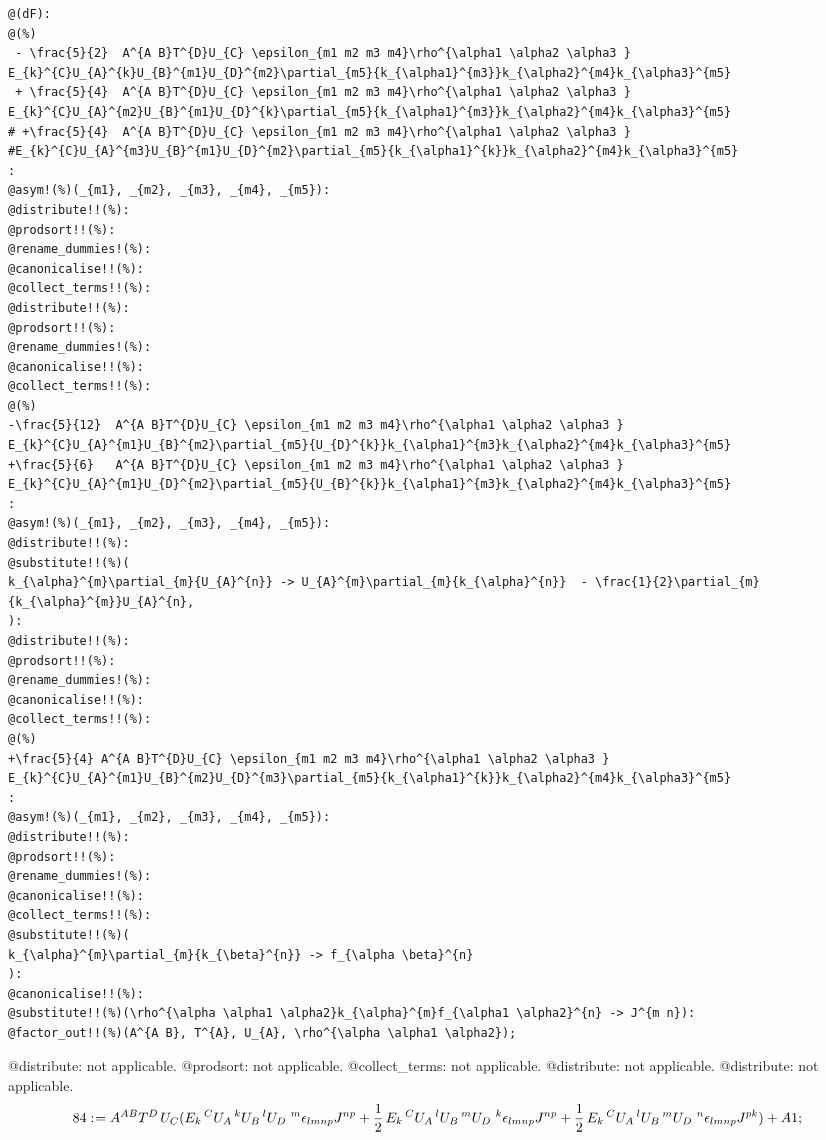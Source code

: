 \documentclass[11pt]{article}
\def\specialcolon{\mathrel{\mathop{:}}\hspace{-.5em}}
\begin{document}
{\color[named]{Blue}\begin{verbatim}
@(dF):
@(%) 
 - \frac{5}{2}  A^{A B}T^{D}U_{C} \epsilon_{m1 m2 m3 m4}\rho^{\alpha1 \alpha2 \alpha3 }
E_{k}^{C}U_{A}^{k}U_{B}^{m1}U_{D}^{m2}\partial_{m5}{k_{\alpha1}^{m3}}k_{\alpha2}^{m4}k_{\alpha3}^{m5}
 + \frac{5}{4}  A^{A B}T^{D}U_{C} \epsilon_{m1 m2 m3 m4}\rho^{\alpha1 \alpha2 \alpha3 }
E_{k}^{C}U_{A}^{m2}U_{B}^{m1}U_{D}^{k}\partial_{m5}{k_{\alpha1}^{m3}}k_{\alpha2}^{m4}k_{\alpha3}^{m5}
# +\frac{5}{4}  A^{A B}T^{D}U_{C} \epsilon_{m1 m2 m3 m4}\rho^{\alpha1 \alpha2 \alpha3 }
#E_{k}^{C}U_{A}^{m3}U_{B}^{m1}U_{D}^{m2}\partial_{m5}{k_{\alpha1}^{k}}k_{\alpha2}^{m4}k_{\alpha3}^{m5}
:
@asym!(%)(_{m1}, _{m2}, _{m3}, _{m4}, _{m5}):
@distribute!!(%):
@prodsort!!(%):
@rename_dummies!(%):
@canonicalise!!(%):
@collect_terms!!(%):
@distribute!!(%):
@prodsort!!(%):
@rename_dummies!(%):
@canonicalise!!(%):
@collect_terms!!(%):
@(%) 
-\frac{5}{12}  A^{A B}T^{D}U_{C} \epsilon_{m1 m2 m3 m4}\rho^{\alpha1 \alpha2 \alpha3 }
E_{k}^{C}U_{A}^{m1}U_{B}^{m2}\partial_{m5}{U_{D}^{k}}k_{\alpha1}^{m3}k_{\alpha2}^{m4}k_{\alpha3}^{m5}
+\frac{5}{6}   A^{A B}T^{D}U_{C} \epsilon_{m1 m2 m3 m4}\rho^{\alpha1 \alpha2 \alpha3 }
E_{k}^{C}U_{A}^{m1}U_{D}^{m2}\partial_{m5}{U_{B}^{k}}k_{\alpha1}^{m3}k_{\alpha2}^{m4}k_{\alpha3}^{m5}
:
@asym!(%)(_{m1}, _{m2}, _{m3}, _{m4}, _{m5}):
@distribute!!(%):
@substitute!!(%)(
k_{\alpha}^{m}\partial_{m}{U_{A}^{n}} -> U_{A}^{m}\partial_{m}{k_{\alpha}^{n}}  - \frac{1}{2}\partial_{m}{k_{\alpha}^{m}}U_{A}^{n},
):
@distribute!!(%):
@prodsort!!(%):
@rename_dummies!(%):
@canonicalise!!(%):
@collect_terms!!(%):
@(%) 
+\frac{5}{4} A^{A B}T^{D}U_{C} \epsilon_{m1 m2 m3 m4}\rho^{\alpha1 \alpha2 \alpha3 }
E_{k}^{C}U_{A}^{m1}U_{B}^{m2}U_{D}^{m3}\partial_{m5}{k_{\alpha1}^{k}}k_{\alpha2}^{m4}k_{\alpha3}^{m5}
:
@asym!(%)(_{m1}, _{m2}, _{m3}, _{m4}, _{m5}):
@distribute!!(%):
@prodsort!!(%):
@rename_dummies!(%):
@canonicalise!!(%):
@collect_terms!!(%):
@substitute!!(%)(
k_{\alpha}^{m}\partial_{m}{k_{\beta}^{n}} -> f_{\alpha \beta}^{n}
):
@canonicalise!!(%):
@substitute!!(%)(\rho^{\alpha \alpha1 \alpha2}k_{\alpha}^{m}f_{\alpha1 \alpha2}^{n} -> J^{m n}):
@factor_out!!(%)(A^{A B}, T^{A}, U_{A}, \rho^{\alpha \alpha1 \alpha2});
\end{verbatim}}
@distribute: not applicable.
@prodsort: not applicable.
@collect\_terms: not applicable.
@distribute: not applicable.
@distribute: not applicable.
\begin{dmath*}[compact, spread=2pt]
84\specialcolon{}= {A}^{A B} {T}^{D\, } {U}_{C} ({E}_{k}\,^{C} {U}_{A}\,^{k} {U}_{B}\,^{l} {U}_{D\, }\,^{m} {\epsilon}_{l m n p} {J}^{n p} + \frac{1}{2}\, {E}_{k}\,^{C} {U}_{A}\,^{l} {U}_{B}\,^{m} {U}_{D\, }\,^{k} {\epsilon}_{l m n p} {J}^{n p} + \frac{1}{2}\, {E}_{k}\,^{C} {U}_{A}\,^{l} {U}_{B}\,^{m} {U}_{D\, }\,^{n} {\epsilon}_{l m n p} {J}^{p k}) + A1;
\end{dmath*}
\end{document}
